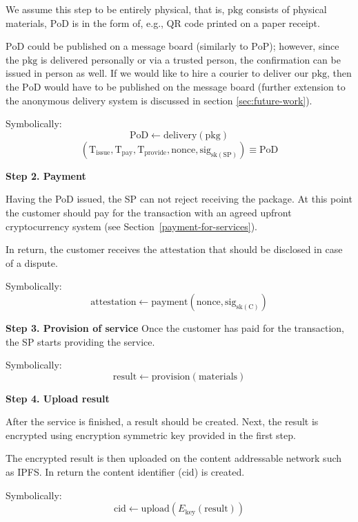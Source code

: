 \documentclass{ieeeaccess}
\begin{document}
We assume this step to be entirely physical, that is, $\mathrm{pkg}$ consists of physical materials, $\mathrm{PoD}$ is in the form of, e.g., QR code printed on a paper receipt. 

$\mathrm{PoD}$ could be published on a message board (similarly to $\mathrm{PoP}$); however, since the $\mathrm{pkg}$ is delivered personally or via a trusted person, the confirmation can be issued in person as well. If we would like to hire a courier to deliver our $\mathrm{pkg}$, then the $\mathrm{PoD}$ would have to be published on the message board (further extension to the anonymous delivery system is discussed in section \ref{sec:future-work}).

Symbolically: 
\[
\mathrm{PoD} \gets \mathrm{delivery}(\mathrm{pkg})
\]
\[
(\mathrm{T}_\mathrm{issue}, \mathrm{T}_\mathrm{pay}, \mathrm{T}_\mathrm{provide}, \mathrm{nonce}, \mathrm{sig}_{\mathrm{sk}(\mathrm{SP})}) \equiv \mathrm{PoD}
\]

\noindent \textbf
{Step 2. Payment}\label{step-2-payment}

Having the PoD issued, the SP can not reject receiving the package. At this point the
customer should pay for the transaction with an agreed upfront cryptocurrency system (see Section~\ref{payment-for-services}).

In return, the customer receives the $\mathrm{attestation}$ that should be disclosed in case of a dispute.

Symbolically: 
\[
\mathrm{attestation} \gets \mathrm{payment}(\mathrm{nonce}, \mathrm{sig}_{\mathrm{sk}(\mathrm{C})})
\]

\noindent \textbf
{Step 3. Provision of service}\label{step-3-provision-of-service} 
Once the customer has paid for the transaction, the SP starts providing the service.

Symbolically: 
\[
\mathrm{result} \gets \mathrm{provision}(\mathrm{materials})
\]

\noindent \textbf
{Step 4. Upload result }\label{step-4-results-upload}

After the service is finished, a result should be created. Next, the result is encrypted using encryption symmetric $\mathrm{key}$ provided in the first step.

The encrypted result is then uploaded on the content addressable network such as IPFS. In return the content identifier ($\mathrm{cid}$) is created.

Symbolically: 
\[
\mathrm{cid} \gets \mathrm{upload}(E_{\mathrm{key}}(\mathrm{result}))
\]
\end{document}
